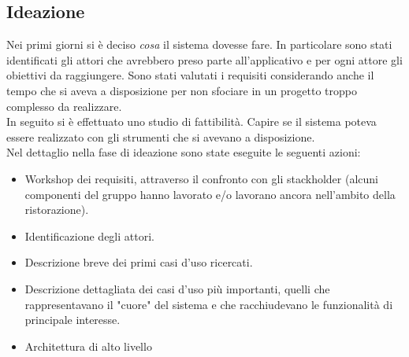 \subsection{Ideazione}
Nei primi giorni si è deciso \textit{cosa} il sistema dovesse fare. In particolare sono stati identificati gli attori che avrebbero preso parte all'applicativo e per ogni attore gli obiettivi da raggiungere. Sono stati valutati i requisiti considerando anche il tempo che si aveva a disposizione per non sfociare in un progetto troppo complesso da realizzare.
\\In seguito si è effettuato uno studio di fattibilità. Capire se il sistema poteva essere realizzato con gli strumenti che si avevano a disposizione. 
\\Nel dettaglio nella fase di ideazione sono state eseguite le seguenti azioni:
\begin{itemize}
	\item Workshop dei requisiti, attraverso il confronto con gli stackholder (alcuni componenti del gruppo hanno lavorato e/o lavorano ancora nell'ambito della ristorazione).
	\item Identificazione degli attori.
	\item Descrizione breve dei primi casi d'uso ricercati.
	\item Descrizione dettagliata dei casi d'uso più importanti, quelli che rappresentavano il "cuore" del sistema e che racchiudevano le funzionalità di principale interesse.
	\item Architettura di alto livello 	
\end{itemize} 

